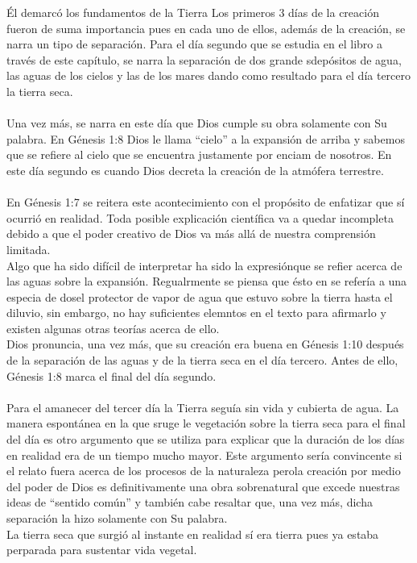 \begin{section}{Él demarcó los fundamentos de la Tierra}
Los primeros 3 días de la creación fueron de suma importancia pues en cada uno de ellos, además de la creación, se narra un tipo de separación. Para el día segundo que se estudia en el libro a través de este capítulo, se narra la separación de dos grande sdepósitos de agua, las aguas de los cielos y las de los mares dando como resultado para el día tercero la tierra seca.\\
\\
Una vez más, se narra en este día que Dios cumple su obra solamente con Su palabra. En Génesis 1:8 Dios le llama ``cielo'' a la expansión de arriba y sabemos que se refiere al cielo que se encuentra justamente por enciam de nosotros. En este día segundo es cuando Dios decreta la creación de la atmófera terrestre.\\
\\
En Génesis 1:7 se reitera este acontecimiento con el propósito de enfatizar que sí ocurrió en realidad. Toda posible explicación científica va a quedar incompleta debido a que el poder creativo de Dios va más allá de nuestra comprensión limitada.\\
Algo que ha sido difícil de interpretar ha sido la expresiónque se refier acerca de las aguas sobre la expansión. Regualrmente se piensa que ésto en se refería a una especia de dosel protector de vapor de agua que estuvo sobre la tierra hasta el diluvio, sin embargo, no hay suficientes elemntos en el texto para afirmarlo y existen algunas otras teorías acerca de ello.\\
Dios pronuncia, una vez más, que su creación era buena en Génesis 1:10 después de la separación de las aguas y de la tierra seca en el día tercero. Antes de ello, Génesis 1:8 marca el final del día segundo.\\
\\
Para el amanecer del tercer día la Tierra seguía sin vida y cubierta de agua. La manera espontánea en la que sruge le vegetación sobre la tierra seca para el final del día es otro argumento que se utiliza para explicar que la duración de los días en realidad era de un tiempo mucho mayor. Este argumento sería convincente si el relato fuera acerca de los procesos de la naturaleza perola creación por medio del poder de Dios es definitivamente una obra sobrenatural que excede nuestras ideas de ``sentido común'' y también cabe resaltar que, una vez más, dicha separación la hizo solamente con Su palabra.\\
La tierra seca que surgió al instante en realidad sí era tierra pues ya estaba perparada para sustentar vida vegetal.\\

\end{section}
